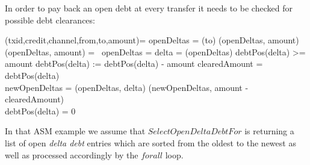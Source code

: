 In order to pay back an open debt at every transfer it needs to be checked for possible debt clearances:

\begin{asm}
	(txid,credit,channel,from,to,amount)=\+
		\LET openDeltas = (to)\+
			(openDeltas, amount)\dec\-
	\WHERE \+
		(openDeltas, amount) =\+
		\IF\ \NOT openDeltas = \emptyset \THEN\+
		\LET delta = (openDeltas)\+
			\IF debtPos(delta) >= amount \THEN\+
				debtPos(delta) := debtPos(delta) - amount\-
			\ELSE\+
				\LET clearedAmount = debtPos(delta)\\
				\LET newOpenDeltas = (openDeltas, delta)\+
					(newOpenDeltas, amount - clearedAmount)\\
					debtPos(delta) = 0
\end{asm}

In that ASM example we assume that $SelectOpenDeltaDebtFor$ is returning a list of open \textit{delta debt} entries which are sorted from the oldest to the newest as well as processed accordingly by the $forall$ loop.
